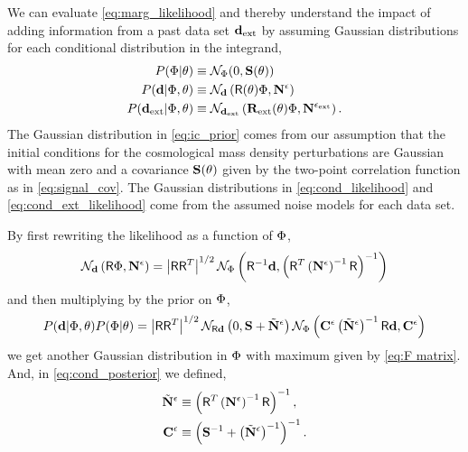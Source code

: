 \documentclass[11pt, letterpaper]{article}
\begin{document}
We can evaluate \autoref{eq:marg_likelihood} and thereby understand the impact of adding information
from a past data set $\mathbf{d}_{\rm ext}$ by assuming Gaussian distributions for each conditional distribution
in the integrand,
\begin{align}
	P(\Phi | \theta) &\equiv \mathcal{N}_{\Phi}(0, \mathbf{S}(\theta))
	\label{eq:ic_prior}\\
	P(\mathbf{d} | \Phi, \theta) &\equiv
		\mathcal{N}_{\mathbf{d}} \left(\mathsf{R}(\theta)\Phi, \mathbf{N}^{\epsilon}\right)
	\label{eq:cond_likelihood}\\
	P(\mathbf{d}_{\rm ext} | \Phi, \theta) &\equiv
		\mathcal{N}_{\mathbf{d}_{\rm ext}} \left(\mathbf{R}_{\rm ext}(\theta)\Phi, \mathbf{N}^{\epsilon_{\rm ext}}\right).
	\label{eq:cond_ext_likelihood}
\end{align}
The Gaussian distribution in \autoref{eq:ic_prior} comes from our assumption that the
initial conditions for the cosmological mass density perturbations are Gaussian with mean zero and
a covariance $\mathbf{S}(\theta)$ given by the two-point correlation function as in \autoref{eq:signal_cov}.
The Gaussian distributions in \autoref{eq:cond_likelihood} and \autoref{eq:cond_ext_likelihood} come from
the assumed noise models for each data set.

By first rewriting the likelihood as a function of $\Phi$,
\begin{equation}
	\mathcal{N}_{\mathbf{d}} \left(\mathsf{R}\Phi, \mathbf{N}^{\epsilon}\right) =
	\left|\mathsf{R}\mathsf{R}^{T}\right|^{1/2}
	\mathcal{N}_{\Phi} \left(\mathsf{R}^{-1}\mathbf{d}, \left(\mathsf{R}^{T}\left(\mathbf{N}^{\epsilon}\right)^{-1}\mathsf{R}\right)^{-1}\right)
\end{equation}
and then multiplying by the prior on $\Phi$,
\begin{equation}\label{eq:cond_posterior}
	P(\mathbf{d}|\Phi,\theta)P(\Phi|\theta) =
	\left|\mathsf{R}\mathsf{R}^{T}\right|^{1/2}
	\mathcal{N}_{\mathsf{R}\mathbf{d}} \left(0, \mathbf{S} + \tilde{\mathbf{N}}^{\epsilon}\right)
	\mathcal{N}_{\Phi} \left(\mathbf{C}^{\epsilon} \left(\tilde{\mathbf{N}}^{\epsilon}\right)^{-1} \mathsf{R} \mathbf{d}, \mathbf{C}^{\epsilon}\right)
\end{equation}
we get another Gaussian distribution in $\Phi$ with maximum given by \autoref{eq:F matrix}.
And, in \autoref{eq:cond_posterior} we defined,
\begin{align}
	\tilde{\mathbf{N}}^{\epsilon} &\equiv \left(\mathsf{R}^{T} \left(\mathbf{N}^{\epsilon}\right)^{-1} \mathsf{R}\right)^{-1},
	\\
	\mathbf{C}^{\epsilon} &\equiv \left(\mathbf{S}^{-1} + \left(\tilde{\mathbf{N}}^{\epsilon}\right)^{-1}\right)^{-1}.
	\label{eq:cmat}
\end{align}
\end{document}
